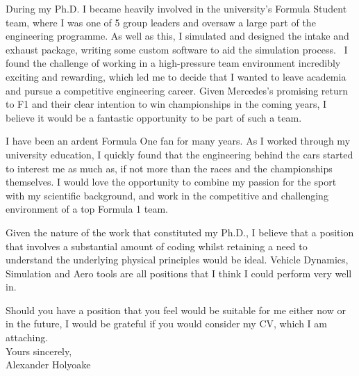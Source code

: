 \documentclass[a4paper,10pt]{article}
\begin{document}
During my Ph.D. I became heavily involved in the university's Formula Student team, where I was one of 5 group leaders and oversaw a large part of the engineering programme. As well as this, I simulated and designed the intake and exhaust package, writing some custom software to aid the simulation process.  I found the challenge of working in a high-pressure team environment incredibly exciting and rewarding, which led me to decide that I wanted to leave academia and pursue a competitive engineering career. Given Mercedes's promising return to F1 and their clear intention to win championships in the coming years, I believe it would be a fantastic opportunity to be part of such a team.

I have been an ardent Formula One fan for many years. As I worked through my university education, I quickly found that the engineering behind the cars started to interest me as much as, if not more than the races and the championships themselves. I would love the opportunity to combine my passion for the sport with my scientific background, and work in the competitive and challenging environment of a top Formula 1 team. 

Given the nature of the work that constituted my Ph.D., I believe that a position that involves a substantial amount of coding whilst retaining a need to understand the underlying physical principles would be ideal. Vehicle Dynamics, Simulation and Aero tools are all positions that I think I could perform very well in.

Should you have a position that you feel would be suitable for me either now or in the future, I would be grateful if you would consider my CV, which I am attaching.
\\

\noindent
Yours sincerely,\\ 

Alexander Holyoake  
\end{document}

